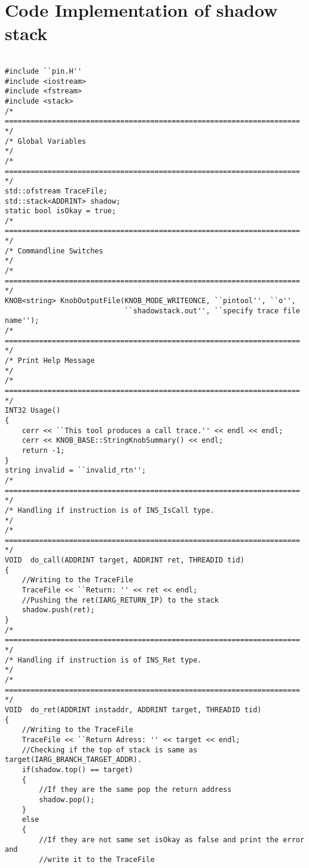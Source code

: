 \documentclass[a4paper, 11pt]{article}
\begin{document}
\section*{Code Implementation of shadow stack}
\begin{lstlisting}

#include ``pin.H''
#include <iostream>
#include <fstream>
#include <stack>
/* ===================================================================== */
/* Global Variables                                                      */
/* ===================================================================== */
std::ofstream TraceFile;
std::stack<ADDRINT> shadow;
static bool isOkay = true;
/* ===================================================================== */
/* Commandline Switches                                                  */
/* ===================================================================== */
KNOB<string> KnobOutputFile(KNOB_MODE_WRITEONCE, ``pintool'', ``o'',
                            ``shadowstack.out'', ``specify trace file name'');
/* ===================================================================== */
/* Print Help Message                                                    */
/* ===================================================================== */
INT32 Usage()
{
    cerr << ``This tool produces a call trace.'' << endl << endl;
    cerr << KNOB_BASE::StringKnobSummary() << endl;
    return -1;
}
string invalid = ``invalid_rtn'';
/* ===================================================================== */
/* Handling if instruction is of INS_IsCall type.                        */
/* ===================================================================== */
VOID  do_call(ADDRINT target, ADDRINT ret, THREADID tid)
{
    //Writing to the TraceFile
    TraceFile << ``Return: '' << ret << endl;
    //Pushing the ret(IARG_RETURN_IP) to the stack
    shadow.push(ret);
}
/* ===================================================================== */
/* Handling if instruction is of INS_Ret type.                           */
/* ===================================================================== */
VOID  do_ret(ADDRINT instaddr, ADDRINT target, THREADID tid)
{
    //Writing to the TraceFile
    TraceFile << ``Return Adress: '' << target << endl;
    //Checking if the top of stack is same as target(IARG_BRANCH_TARGET_ADDR).
    if(shadow.top() == target)
    {
        //If they are the same pop the return address
        shadow.pop();
    }
    else
    {
        //If they are not same set isOkay as false and print the error and 
        //write it to the TraceFile

\end{lstlisting}
\end{document}
